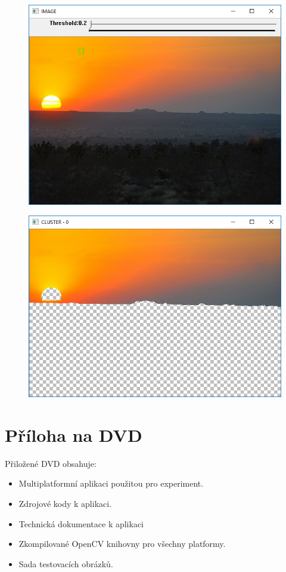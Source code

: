 \documentclass[czech, master, public, dept460, male, cpdeclaration, oneside]{diploma}
\begin{document}
\begin{figure}[H]
	\vspace*{+3.0mm}
	\centering
	\includegraphics[width=13cm]{Figures/results/geodesic/img3/original.png}
\end{figure}
\begin{figure}[H]
	\vspace*{+3.0mm}
	\centering
	\includegraphics[width=13cm]{Figures/results/geodesic/img3/cluster0.png}
\end{figure}

\section{Příloha na DVD}
Přiložené DVD obsahuje:
\begin{itemize}
	\item Multiplatformní aplikaci použitou pro experiment.
	\item Zdrojové kody k aplikaci.
	\item Technická dokumentace k aplikaci
	\item Zkompilované OpenCV knihovny pro všechny platformy.
	\item Sada testovacích obrázků.
\end{itemize}
\end{document}
